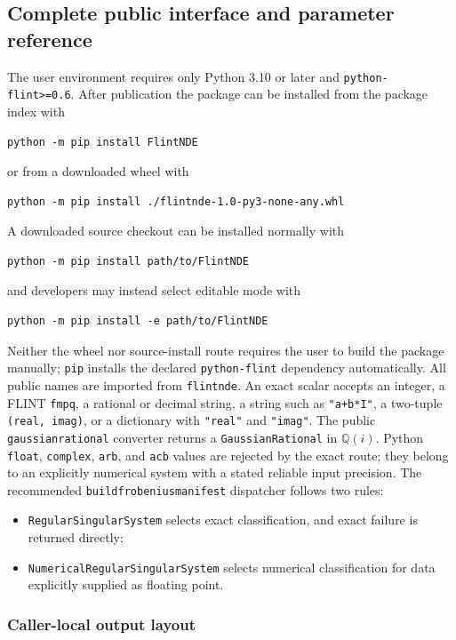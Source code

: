 \documentclass[11pt]{article}
\renewcommand{\_}{\origunderscore\allowbreak}
\begin{document}
\subsection{Complete public interface and parameter reference}
\label{sec:user-interface}
\label{subsec:public-interface}

The user environment requires only Python 3.10 or later and
\texttt{python-flint>=0.6}.  After publication the package can be installed from the package
index with
\begin{verbatim}
python -m pip install FlintNDE
\end{verbatim}
or from a downloaded wheel with
\begin{verbatim}
python -m pip install ./flintnde-1.0-py3-none-any.whl
\end{verbatim}
A downloaded source checkout can be installed normally with
\begin{verbatim}
python -m pip install path/to/FlintNDE
\end{verbatim}
and developers may instead select editable mode with
\begin{verbatim}
python -m pip install -e path/to/FlintNDE
\end{verbatim}
Neither the wheel nor source-install route requires the user to build the package manually;
\texttt{pip} installs the declared \texttt{python-flint} dependency automatically.
All public names are imported from \texttt{flintnde}.  An exact scalar accepts an integer,
a FLINT \texttt{fmpq}, a rational or decimal string, a string such as \texttt{"a+b*I"}, a
two-tuple \texttt{(real, imag)}, or a dictionary with \texttt{"real"} and \texttt{"imag"}.
The public \texttt{gaussian\_rational} converter returns a \texttt{GaussianRational} in
$\mathbb Q(i)$.  Python \texttt{float}, \texttt{complex}, \texttt{arb}, and \texttt{acb}
values are rejected by the exact route; they belong to an explicitly numerical system with
a stated reliable input precision.  The recommended
\texttt{build\_frobenius\_manifest} dispatcher follows two rules:
\begin{itemize}
  \item \texttt{RegularSingularSystem} selects exact classification, and exact failure is
  returned directly;
  \item \texttt{NumericalRegularSingularSystem} selects numerical classification for data
  explicitly supplied as floating point.
\end{itemize}

\subsubsection{Caller-local output layout}
\end{document}
